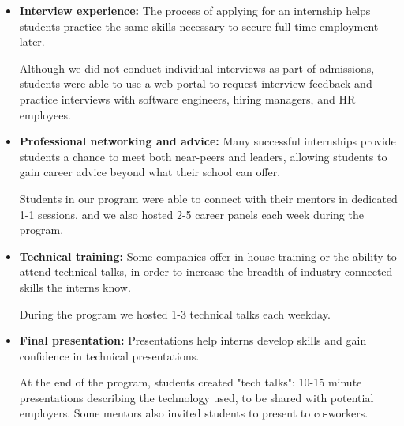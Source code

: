 \begin{itemize}
    \item \textbf{Interview experience:} The process of applying for an internship helps students practice the same skills necessary to secure full-time employment later.
    
    Although we did not conduct individual interviews as part of admissions, students were able to use a web portal to request interview feedback and practice interviews with software engineers, hiring managers, and HR employees.

    \item \textbf{Professional networking and advice:} Many successful internships provide students a chance to meet both near-peers and leaders, allowing students to gain career advice beyond what their school can offer.
    
    Students in our program were able to connect with their mentors in dedicated 1-1 sessions, and we also hosted 2-5 career panels each week during the program.
    
    \item \textbf{Technical training:} Some companies offer in-house training or the ability to attend technical talks, in order to increase the breadth of industry-connected skills the interns know.
    
    During the program we hosted 1-3 technical talks each weekday.
    
    \item \textbf{Final presentation:} Presentations help interns develop skills and gain confidence in technical presentations.
    
    At the end of the program, students created "tech talks": 10-15 minute presentations describing the technology used, to be shared with potential employers. Some mentors also invited students to present to co-workers.
\end{itemize}